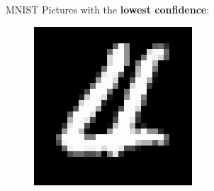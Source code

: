 \documentclass{beamer}
\begin{document}
\begin{frame}{MNIST}
	Pictures with the \textbf{lowest confidence}:
	
	\vspace{0.5cm}
	
	\begin{minipage}[t]{0.32\columnwidth}
		\begin{figure}
			\includegraphics[width=1\columnwidth]{pres_pics/low_conf/40}
		\end{figure}
	\end{minipage}
\hfill
	\begin{minipage}[t]{0.32\columnwidth}
\end{minipage}
\end{frame}
\end{document}
